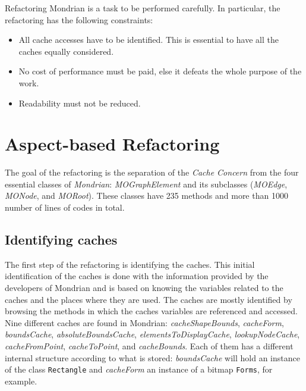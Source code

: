 \documentclass[preprint,10pt]{sigplanconf}
\newcommand{\ct}{\lstinline[backgroundcolor=\color{white},basicstyle=\footnotesize\ttfamily]}
\newcommand{\seclabel}[1]{\label{sec:#1}}
\begin{document}
Refactoring Mondrian is a task to be performed carefully. In particular, the refactoring has the following constraints:

\begin{itemize}
\item All cache accesses have to be identified. This is essential to have all the caches equally considered. 
\item No cost of performance must be paid, else it defeats the whole purpose of the work.
\item Readability must not be reduced.
\end{itemize}

\section{Aspect-based Refactoring}\seclabel{refactoring}


The goal of the refactoring is the separation of the \emph{Cache
Concern} from the four essential classes of \emph{Mondrian}: \emph{MOGraphElement}
and its subclasses (\emph{MOEdge}, \emph{MONode}, and \emph{MORoot}). These classes have 235 methods and more than 1000 number of lines of codes in total.

\subsection{Identifying caches}
The first step of the refactoring is identifying the caches.
This initial identification of the caches is done with the information
provided by the developers of Mondrian and is based on knowing the
variables related to the caches and the places where they are used. The caches are mostly identified by browsing the methods in which the caches variables are referenced and accessed.
Nine different caches are found in Mondrian: \emph{cacheShapeBounds},
\emph{cacheForm}, \emph{boundsCache}, \emph{absoluteBoundsCache},
\emph{elementsToDisplayCache}, \emph{lookupNodeCache}, \emph{cacheFromPoint},
\emph{cacheToPoint}, and \emph{cacheBounds}. Each of them has a different
internal structure according to what is stored: \emph{boundsCache} will hold an instance of the class \ct{Rectangle} and \emph{cacheForm} an instance of a bitmap \ct{Forms}, for example.
\end{document}
